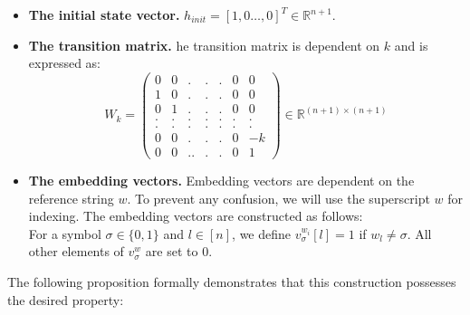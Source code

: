 \begin{itemize}
\item \textbf{The initial state vector.} $h_{init} = [1, 0 \ldots, 0 ]^{T} \in \mathbb{R}^{n+1}$.
 \item \textbf{The transition matrix.} he transition matrix is dependent on $k$ and is expressed as:
\begin{equation}\label{transition}
W_{k} = \begin{pmatrix}
   0 & 0 & .& . & . & 0 & 0\\
   1 & 0 & . & . & . & 0  & 0\\ 
   0 & 1 & . & . & . & 0  & 0\\ 
    . & . & . & . & . & .  & .\\
   . & . & . & . & . & .  & . \\
   0 & 0 & .& . & . & 0 & -k \\ 
   0 & 0 & .. & . & . & 0 &  1 
\end{pmatrix} \in \mathbb{R}^{(n+1) \times (n+1)}
\end{equation}
\item \textbf{The embedding vectors.} Embedding vectors are dependent on the reference string $w$. To prevent any confusion, we will use the superscript $w$ for indexing. The embedding vectors are constructed as follows: \\ For a symbol $\sigma \in \{0,1\}$  and $l \in [n]$, we define $v_{\sigma}^{w_{i}}[l] = 1 $ if $w_{l} \neq \sigma$. All other elements of $v_{\sigma}^{w}$ are set to $0$.
\end{itemize}
The following proposition formally demonstrates that this construction possesses the desired property:
